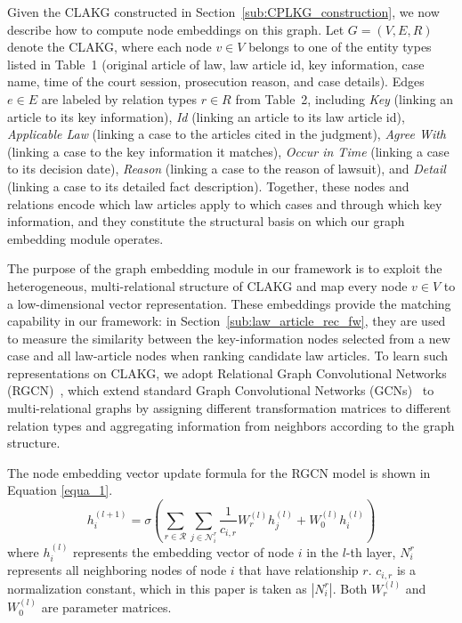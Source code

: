 \documentclass[review,times,nonatbib]{elsarticle} %
\renewcommand{\textcolor}[2]{#2}
\begin{document}
\textcolor{blue}{Given the CLAKG constructed in Section~\ref{sub:CPLKG_construction}, we now describe how to compute node embeddings on this graph. Let $G = (V, E, R)$ denote the CLAKG, where each node $v \in V$ belongs to one of the entity types listed in Table~1 (original article of law, law article id, key information, case name, time of the court session, prosecution reason, and case details). Edges $e \in E$ are labeled by relation types $r \in R$ from Table~2, including \emph{Key} (linking an article to its key information), \emph{Id} (linking an article to its law article id), \emph{Applicable Law} (linking a case to the articles cited in the judgment), \emph{Agree With} (linking a case to the key information it matches), \emph{Occur in Time} (linking a case to its decision date), \emph{Reason} (linking a case to the reason of lawsuit), and \emph{Detail} (linking a case to its detailed fact description). Together, these nodes and relations encode which law articles apply to which cases and through which key information, and they constitute the structural basis on which our graph embedding module operates.}

\textcolor{blue}{The purpose of the graph embedding module in our framework is to exploit the heterogeneous, multi-relational structure of CLAKG and map every node $v \in V$ to a low-dimensional vector representation. These embeddings provide the matching capability in our framework: in Section~\ref{sub:law_article_rec_fw}, they are used to measure the similarity between the key-information nodes selected from a new case and all law-article nodes when ranking candidate law articles. To learn such representations on CLAKG, we adopt Relational Graph Convolutional Networks (RGCN)~\cite{schlichtkrull2018modeling}, which extend standard Graph Convolutional Networks (GCNs)~\cite{kipf2016semi} to multi-relational graphs by assigning different transformation matrices to different relation types and aggregating information from neighbors according to the graph structure.}


The node embedding vector update formula for the RGCN model is shown in Equation \ref{equa_1}.\\
\begin{equation}
\label{equa_1}
h_i^{(l+1)}=\sigma\left(\sum_{r \in \mathcal{R}} \sum_{j \in \mathcal{N}_i^r} \frac{1}{c_{i, r}} W_r^{(l)} h_j^{(l)}+W_0^{(l)} h_i^{(l)}\right)
\end{equation}
where $h_i^{(l)}$ represents the embedding vector of node $i$ in the $l$-th layer, $N_i^r$ represents all neighboring nodes of node $i$ that have relationship $r$. $c_{i, r}$ is a normalization constant, which in this paper is taken as $\left|N_i^r\right|$. Both $W_r^{(l)}$ and $W_0^{(l)}$ are parameter matrices.
\end{document}
